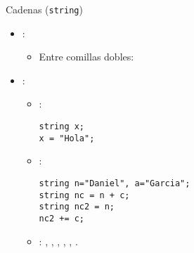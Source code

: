 \begin{frame}[t,fragile]{Cadenas (\texttt{string})}
\begin{itemize}
  \item {}:
    \begin{itemize}
      \item Entre comillas dobles: 
    \end{itemize}

  \item {}:
    \begin{itemize}
      \item {}:
\begin{lstlisting}
string x;
x = "Hola";
\end{lstlisting}
      \item {}:
\begin{lstlisting}
string n="Daniel", a="Garcia";
string nc = n + c;
string nc2 = n;
nc2 += c;
\end{lstlisting}
      \item {}:
        \cppkey{==},
        \cppkey{!=},
        \cppkey{<},
        \cppkey{<=},
        \cppkey{>},
        \cppkey{>=}.
    \end{itemize}
\end{itemize}
\end{frame}

